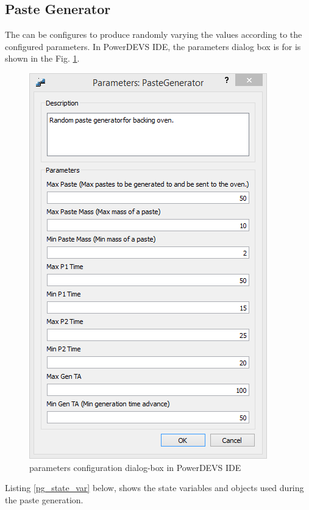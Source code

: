 \documentclass[titlepage]{article}%
\begin{document}
{\begin{lstlisting}[caption={Paste structure}, language=c++, label={paste}]
\end{lstlisting}


\subsection{Paste Generator}
The {} can be configures to produce randomly varying the values according to the configured parameters. In PowerDEVS IDE, the parameters dialog box is for {} is shown in the Fig. \ref{fig:pastegen_params}.

\begin{figure}[htbp]
	\centering
		\includegraphics[scale=0.8]{pastegen_params.PNG}
	\caption{{} parameters configuration dialog-box in PowerDEVS IDE}
	\label{fig:pastegen_params}
\end{figure}

Listing \ref{pg_state_var} below, shows the state variables and objects used during the paste generation.

\begin{lstlisting}[caption={State variables and objects}, language=c++, label={pg_state_var}]


\end{lstlisting}}
\end{document}
